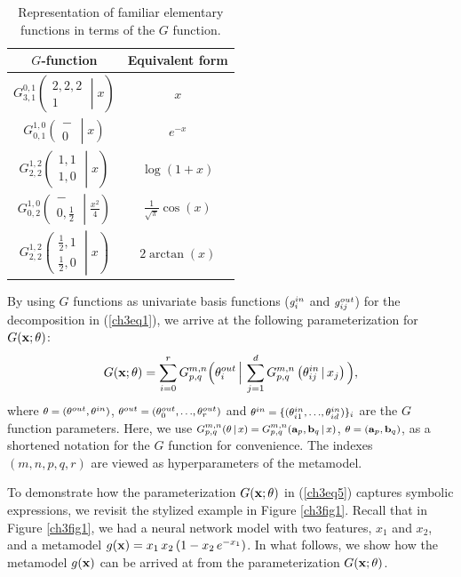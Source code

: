 \documentclass [PhD] {uclathes}
\newcommand{\MeijerG}[7]{G^{#1,#2}_{#3,#4} \left( \begin{smallmatrix} #5 \\ #6 \end{smallmatrix} \middle\vert #7 \right) }
\begin{document}
\begin{table}[t]
  \centering
  \begin{tabular}{cc}
    \toprule
    {\bf $G$-function} & {\bf Equivalent form}  \\
    \midrule
    $\MeijerG{0}{1}{3}{1}{2,2,2}{1}{x}$ & $x$  \\[1ex]
    $\MeijerG{1}{0}{0}{1}{-}{0}{x}$ & $e^{-x}$  \\[1ex]
    $\MeijerG{1}{2}{2}{2}{1,1}{1,0}{x}$ & $\log(1+x)$ \\[1ex]
    $\MeijerG{1}{0}{0}{2}{-}{0,\frac{1}{2}}{\frac{x^2}{4}}$ & $\frac{1}{\sqrt{\pi}}\cos(x)$ \\[1ex]   
    $\MeijerG{1}{2}{2}{2}{\frac{1}{2},1}{\frac{1}{2},0}{x}$ & $2\arctan(x)$ \\
    \bottomrule   
  \end{tabular}
  \caption{Representation of familiar elementary functions in terms of the $G$ function.}
  \label{ch3Table1} 
\end{table}

By using $G$ functions as univariate basis functions ($\mbox{\footnotesize $g_i^{in}$}$ and $\mbox{\footnotesize $g_{ij}^{out}$}$) for the decomposition in (\ref{ch3eq1}), we arrive at the following parameterization for $G({\bf x};\theta)$:
\begin{align}
G({\bf x};\theta) = \sum^r_{i=0} G^{m,n}_{p,q}\Big(\theta^{out}_i\,\Big|\, \sum_{j=1}^d G^{m,n}_{p,q}\left(\theta^{in}_{ij}\,|\, x_j\right)\Big),
\label{ch3eq5}
\end{align}
where $\mbox{\footnotesize $\theta = (\theta^{out}, \theta^{in})$}$, $\mbox{\footnotesize $\theta^{out} = (\theta^{out}_{0},.\,.\,.,\theta^{out}_{r})$}$ and $\mbox{\footnotesize $\theta^{in} = \{(\theta^{in}_{i1},.\,.\,.,\theta^{in}_{id})\}_i$}$ are the $G$ function parameters. Here, we use $\mbox{\footnotesize $G^{m,n}_{p,q}(\theta\,|\,x) = G^{m,n}_{p,q}({\bf a}_p, {\bf b}_q\,|\,x)$}$, $\mbox{\footnotesize $\theta = ({\bf a}_p,{\bf b}_q)$}$, as a shortened notation for the $G$ function for convenience. The indexes $(m,n,p,q,r)$ are viewed as hyperparameters of the metamodel.  

To demonstrate how the parameterization $G({\bf x};\theta)$ in (\ref{ch3eq5}) captures symbolic expressions, we revisit the stylized example in Figure \ref{ch3fig1}. Recall that in Figure \ref{ch3fig1}, we had a neural network model with two features, $x_1$ and $x_2$, and a metamodel $g({\bf x}) = x_1\,x_2\,(1-x_2\,e^{-x_1})$. In what follows, we show how the metamodel $g({\bf x})$ can be arrived at from the parameterization $G({\bf x};\theta)$.
\end{document}

